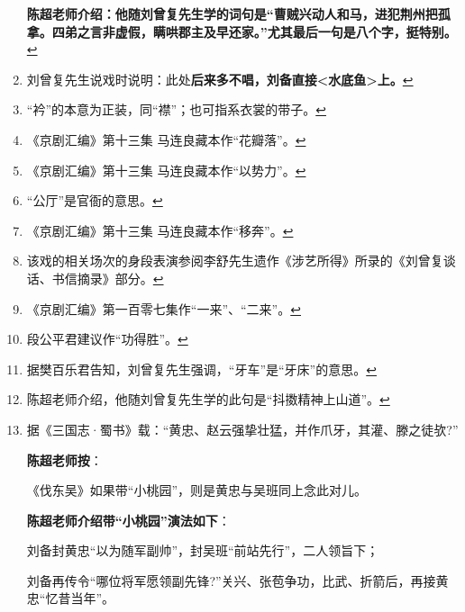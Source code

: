 \begin{enumerate}
  \textbf{陈超老师介绍：他随刘曾复先生学的词句是``曹贼兴动人和马，进犯荆州把孤拿。四弟之言非虚假，瞒哄郡主及早还家。''尤其最后一句是八个字，挺特别。}\protect\hyperlink{fnref188}{↩}
\item
  \leavevmode\hypertarget{fn189}{}%
  刘曾复先生说戏时说明：此处\textbf{后来多不唱，刘备直接\textless{}水底鱼\textgreater{}上。}\protect\hyperlink{fnref189}{↩}
\item
  \leavevmode\hypertarget{fn190}{}%
  ``衿''的本意为正装，同``襟''；也可指系衣裳的带子。\protect\hyperlink{fnref190}{↩}
\item
  \leavevmode\hypertarget{fn191}{}%
  《京剧汇编》第十三集
  马连良藏本作``花瓣落''。\protect\hyperlink{fnref191}{↩}
\item
  \leavevmode\hypertarget{fn192}{}%
  《京剧汇编》第十三集
  马连良藏本作``以势力''。\protect\hyperlink{fnref192}{↩}
\item
  \leavevmode\hypertarget{fn193}{}%
  ``公厅''是官衙的意思。\protect\hyperlink{fnref193}{↩}
\item
  \leavevmode\hypertarget{fn194}{}%
  《京剧汇编》第十三集
  马连良藏本作``移奔''。\protect\hyperlink{fnref194}{↩}
\item
  \leavevmode\hypertarget{fn195}{}%
  该戏的相关场次的身段表演参阅李舒先生遗作《涉艺所得》所录的《刘曾复谈话、书信摘录》部分。\protect\hyperlink{fnref195}{↩}
\item
  \leavevmode\hypertarget{fn196}{}%
  《京剧汇编》第一百零七集作``一来''、``二来''。\protect\hyperlink{fnref196}{↩}
\item
  \leavevmode\hypertarget{fn197}{}%
  段公平君建议作``功得胜''。\protect\hyperlink{fnref197}{↩}
\item
  \leavevmode\hypertarget{fn198}{}%
  据樊百乐君告知，刘曾复先生强调，``牙车''是``牙床''的意思。\protect\hyperlink{fnref198}{↩}
\item
  \leavevmode\hypertarget{fn199}{}%
  陈超老师介绍，他随刘曾复先生学的此句是``抖擞精神上山道''。\protect\hyperlink{fnref199}{↩}
\item
  \leavevmode\hypertarget{fn200}{}%
  据《三国志·蜀书》载：``黄忠、赵云强挚壮猛，并作爪牙，其灌、滕之徒欤?''

  \textbf{陈超老师按}：

  《伐东吴》如果带``小桃园''，则是黄忠与吴班同上念此对儿。

  \textbf{陈超老师介绍带``小桃园''演法如下}：

  刘备封黄忠``以为随军副帅''，封吴班``前站先行''，二人领旨下；

  刘备再传令``哪位将军愿领副先锋?''关兴、张苞争功，比武、折箭后，再接黄忠``忆昔当年''。


\end{enumerate}

